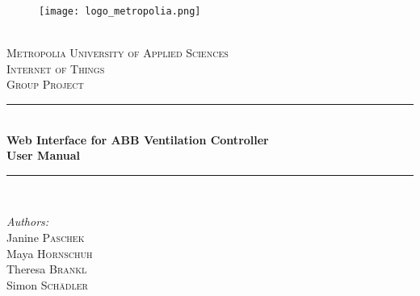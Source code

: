 \newcommand{\HRule}{\rule{\linewidth}{0.5mm}} %
\thispagestyle{empty}
\begin{center} %
 

\begin{figure}
	\setlength{\belowcaptionskip}{50pt}
	\begin{center}
   		\texttt{[image: logo\_metropolia.png]}
	\end{center}
\end{figure}


\phantom{This text will be invisible}\\[1cm]
\textsc{\Large Metropolia University of Applied Sciences}\\[1.25cm] %
\textsc{\Large Internet of Things}\\[1.0cm] %
\textsc{\Large Group Project}\\[1.5cm] %

\HRule \\[0.2cm]
\large{ \bfseries Web Interface for ABB Ventilation Controller\\
User Manual
 }\\[0.02cm] %
\HRule \\[1.5cm]
 

\begin{minipage}{0.5\linewidth}
\begin{flushleft}\normalsize
\emph{Authors:}\\
Janine  \textsc{Paschek} %
\\
Maya \textsc{Hornschuh} %
\\
Theresa \textsc{Brankl} %
\\
Simon \textsc{Schädler} %
\end{flushleft}
\end{minipage}


\end{center}
